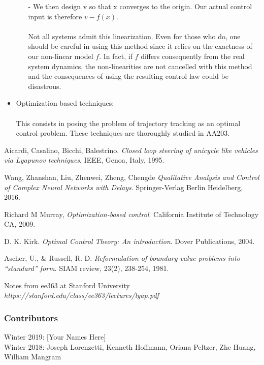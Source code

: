 \documentclass[twoside]{article}
\begin{document}
\begin{itemize}
\begin{enumerate}
     - We then design v so that x converges to the origin. Our actual control input is therefore $v - f(x)$. \\
     \\
     Not all systems admit this linearization. Even for those who do, one should be careful in using this method since it relies on the exactness of our non-linear model $f$. In fact, if $f$ differs consequently from the real system dynamics, the non-linearities are not cancelled with this method and the consequences of using the resulting control law could be disastrous.
  \end{enumerate}
  \item Optimization based techniques: \\
  \\
  This consists in posing the problem of trajectory tracking as an optimal control problem. These techniques are thoroughly studied in AA203.
\end{itemize}

\begin{thebibliography}{9}
Aicardi, Casalino, Bicchi, Balestrino.
\textit{Closed loop steering of unicycle like vehicles via Lyapunov techniques}.
IEEE, Genoa, Italy, 1995.


Wang, Zhanshan, Liu, Zhenwei, Zheng, Chengde
\textit{Qualitative Analysis and Control of Complex Neural Networks with Delays}.
Springer-Verlag Berlin Heidelberg,  2016.


Richard M Murray, \textit{Optimization-based control}. California Institute of Technology CA, 2009.

D. K. Kirk. \textit{Optimal Control Theory: An introduction}. Dover Publications, 2004.

Ascher, U., \& Russell, R. D. \textit{Reformulation of boundary value problems into ``standard'' form}. SIAM review, 23(2), 238-254, 1981.

Notes from ee363 at Stanford University
\textit{https://stanford.edu/class/ee363/lectures/lyap.pdf}

\end{thebibliography}

\subsubsection*{Contributors}
Winter 2019: [Your Names Here]
\\
Winter 2018: Joseph Lorenzetti, Kenneth Hoffmann, Oriana Peltzer, Zhe Huang, William Mangram
\end{document}
